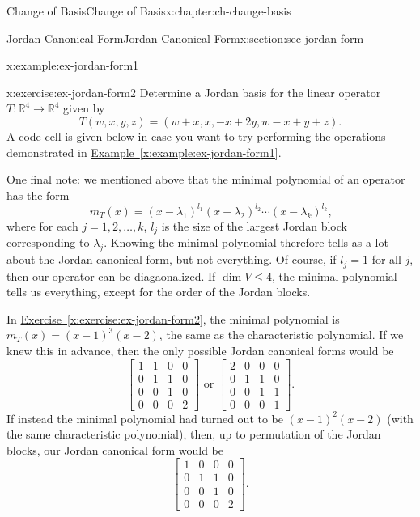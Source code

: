 \documentclass[oneside,10pt,]{book}
\newcommand{\xreffont}{\relax}
\numberwithin{equation}{section}
\newcommand{\bbm}{\begin{bmatrix}}
\newcommand{\ebm}{\end{bmatrix}}
\newcommand{\R}{\mathbb{R}}
\newcommand{\amp}{&}
\begin{document}
\begin{chapterptx}{Change of Basis}{}{Change of Basis}{}{}{x:chapter:ch-change-basis}
\begin{sectionptx}{Jordan Canonical Form}{}{Jordan Canonical Form}{}{}{x:section:sec-jordan-form}
\begin{example}{}{x:example:ex-jordan-form1}
\end{example}
\begin{inlineexercise}{}{x:exercise:ex-jordan-form2}%
Determine a Jordan basis for the linear operator \(T:\R^4\to\R^4\) given by%
\begin{equation*}
T(w,x,y,z)=(w+x,x,-x+2y,w-x+y+z)\text{.}
\end{equation*}
A code cell is given below in case you want to try performing the operations demonstrated in \hyperref[x:example:ex-jordan-form1]{Example~{\xreffont\ref{x:example:ex-jordan-form1}}}.%
\end{inlineexercise}%
One final note: we mentioned above that the minimal polynomial of an operator has the form%
\begin{equation*}
m_T(x)=(x-\lambda_1)^{l_1}(x-\lambda_2)^{l_2}\cdots (x-\lambda_k)^{l_k}\text{,}
\end{equation*}
where for each \(j=1,2,\ldots, k\), \(l_j\) is the size of the largest Jordan block corresponding to \(\lambda_j\). Knowing the minimal polynomial therefore tells as a lot about the Jordan canonical form, but not everything. Of course, if \(l_j=1\) for all \(j\), then our operator can be diagaonalized. If \(\dim V\leq 4\), the minimal polynomial tells us everything, except for the order of the Jordan blocks.%
\par
In \hyperref[x:exercise:ex-jordan-form2]{Exercise~{\xreffont\ref{x:exercise:ex-jordan-form2}}}, the minimal polynomial is \(m_T(x)=(x-1)^3(x-2)\), the same as the characteristic polynomial. If we knew this in advance, then the only possible Jordan canonical forms would be%
\begin{equation*}
\bbm 1\amp 1\amp 0\amp 0\\
0\amp 1\amp 1\amp 0\\
0\amp 0\amp 1\amp 0\\
0\amp 0\amp 0\amp 2\ebm \text{ or } \bbm 2\amp 0\amp 0\amp 0\\
0\amp 1\amp 1\amp 0\\
0\amp 0\amp 1\amp 1\\
0\amp 0\amp 0\amp 1\ebm\text{.}
\end{equation*}
If instead the minimal polynomial had turned out to be \((x-1)^2(x-2)\) (with the same characteristic polynomial), then, up to permutation of the Jordan blocks, our Jordan canonical form would be%
\begin{equation*}
\bbm 1\amp 0\amp 0\amp 0\\0\amp 1\amp 1\amp 0\\0\amp 0\amp 1\amp 0\\0\amp 0\amp 0\amp 2\ebm\text{.}

\end{equation*}
\end{sectionptx}
\end{chapterptx}
\end{document}
